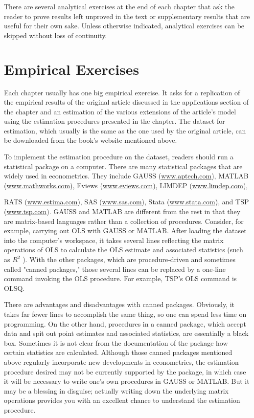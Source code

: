 \documentclass[10pt]{article}
\begin{document}
There are several analytical exercises at the end of each chapter that ask the reader to prove results left unproved in the text or supplementary results that are useful for their own sake. Unless otherwise indicated, analytical exercises can be skipped without loss of continuity.

\section*{Empirical Exercises}
Each chapter usually has one big empirical exercise. It asks for a replication of the empirical results of the original article discussed in the applications section of the chapter and an estimation of the various extensions of the article's model using the estimation procedures presented in the chapter. The dataset for estimation, which usually is the same as the one used by the original article, can be downloaded from the book's website mentioned above.

To implement the estimation procedure on the dataset, readers should run a statistical package on a computer. There are many statistical packages that are widely used in econometrics. They include GAUSS (\href{http://www.aptech.com}{www.aptech.com}), MATLAB (\href{http://www.mathworks.com}{www.mathworks.com}), Eviews (\href{http://www.eviews.com}{www.eviews.com}), LIMDEP (\href{http://www.limdep.com}{www.limdep.com}),

RATS (\href{http://www.estima.com}{www.estima.com}), SAS (\href{http://www.sas.com}{www.sas.com}), Stata (\href{http://www.stata.com}{www.stata.com}), and TSP (\href{http://www.tsp.com}{www.tsp.com}). GAUSS and MATLAB are different from the rest in that they are matrix-based languages rather than a collection of procedures. Consider, for example, carrying out OLS with GAUSS or MATLAB. After loading the dataset into the computer's workspace, it takes several lines reflecting the matrix operations of OLS to calculate the OLS estimate and associated statistics (such as $R^{2}$ ). With the other packages, which are procedure-driven and sometimes called "canned packages," those several lines can be replaced by a one-line command invoking the OLS procedure. For example, TSP's OLS command is OLSQ.

There are advantages and disadvantages with canned packages. Obviously, it takes far fewer lines to accomplish the same thing, so one can spend less time on programming. On the other hand, procedures in a canned package, which accept data and spit out point estimates and associated statistics, are essentially a black box. Sometimes it is not clear from the documentation of the package how certain statistics are calculated. Although those canned packages mentioned above regularly incorporate new developments in econometrics, the estimation procedure desired may not be currently supported by the package, in which case it will be necessary to write one's own procedures in GAUSS or MATLAB. But it may be a blessing in disguise; actually writing down the underlying matrix operations provides you with an excellent chance to understand the estimation procedure.
\end{document}
